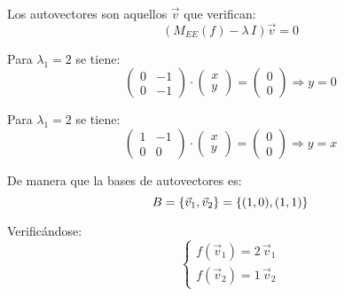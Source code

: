 \documentclass[a5paper,12pt,twoside]{book}
\begin{document}
\begin{mdframed}[style=ExampleFrame]
    Los autovectores son aquellos $\Vec{v}$ que verifican:
    \begin{equation*}
        \left( M_{EE}(f) - \lambda \, I \right) \Vec{v} = 0
    \end{equation*}
    
    Para $\lambda_1=2$ se tiene:
    \begin{equation}
        \begin{pmatrix}
            0 & -1
            \\
            0 & -1
        \end{pmatrix}
        \cdot
        \begin{pmatrix}
            x
            \\
            y
        \end{pmatrix}
        =
        \begin{pmatrix}
            0
            \\
            0
        \end{pmatrix}
        \Rightarrow y=0
    \end{equation}
    
    Para $\lambda_1=2$ se tiene:
    \begin{equation}
        \begin{pmatrix}
            1 & -1
            \\
            0 & 0
        \end{pmatrix}
        \cdot
        \begin{pmatrix}
            x
            \\
            y
        \end{pmatrix}
        =
        \begin{pmatrix}
            0
            \\
            0
        \end{pmatrix}
        \Rightarrow y=x
    \end{equation}
    
    De manera que la bases de autovectores es:
    \begin{equation*}
        B = { \left\{ {\Vec{v}_1 , \Vec{v}_2} \right\} } = { \left\{ {(1,0),(1,1)} \right\} }
    \end{equation*}
    
    Verificándose:
    \begin{equation*}
        \left\{
        \begin{aligned}
            f(\Vec{v}_1) = 2 \, \Vec{v}_1
            \\
            f(\Vec{v}_2) = 1 \, \Vec{v}_2
        \end{aligned}
        \right.
    \end{equation*}
    

\end{mdframed}
\end{document}
